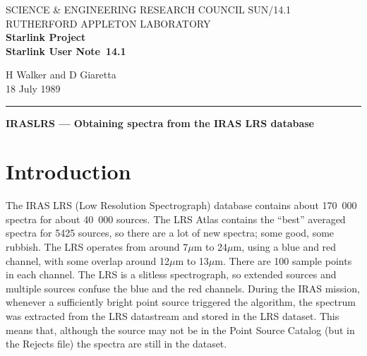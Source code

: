 \pagestyle{myheadings}

\newcommand{\stardoccategory}  {Starlink User Note}
\newcommand{\stardocinitials}  {SUN}
\newcommand{\stardocnumber}    {14.1}
\newcommand{\stardocauthors}   {H Walker and D Giaretta}
\newcommand{\stardocdate}      {18 July 1989}
\newcommand{\stardoctitle}     {IRASLRS --- Obtaining spectra from the IRAS LRS database}

\newcommand{\stardocname}{\stardocinitials /\stardocnumber}
\markright{\stardocname}
\setlength{\textwidth}{160mm}
\setlength{\textheight}{240mm}
\setlength{\topmargin}{-5mm}
\setlength{\oddsidemargin}{0mm}
\setlength{\evensidemargin}{0mm}
\setlength{\parindent}{0mm}
\setlength{\parskip}{\medskipamount}
\setlength{\unitlength}{1mm}


\thispagestyle{empty}
SCIENCE \& ENGINEERING RESEARCH COUNCIL \hfill \stardocname\\
RUTHERFORD APPLETON LABORATORY\\
{\large\bf Starlink Project\\}
{\large\bf \stardoccategory\ \stardocnumber}
\begin{flushright}
\stardocauthors\\
\stardocdate
\end{flushright}
\vspace{-4mm}
\rule{\textwidth}{0.5mm}
\vspace{5mm}
\begin{center}
{\Large\bf \stardoctitle}
\end{center}
\vspace{5mm}

\section{Introduction}
The IRAS LRS (Low Resolution Spectrograph) database contains about
170~000 spectra for about 40~000 sources.
The LRS Atlas contains the ``best'' averaged spectra for 5425 sources, so
there are a lot of new spectra; some good, some rubbish.
The LRS operates from around 7$\mu$m to 24$\mu$m, using a blue and red
channel, with some overlap around 12$\mu$m to 13$\mu$m.
There are 100 sample points in each channel.
The LRS is a slitless spectrograph, so extended sources and multiple sources
confuse the blue and the red channels.
During the IRAS mission, whenever a sufficiently bright point source
triggered the algorithm, the spectrum was extracted from the LRS datastream
and stored in the LRS dataset.
This means that, although the source may not be in the Point Source Catalog
(but in the Rejects file) the spectra are still in the dataset.

